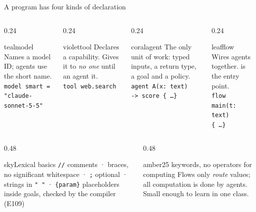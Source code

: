 \documentclass[aspectratio=169,11pt]{beamer}
\begin{document}
\begin{frame}[fragile]{A program has four kinds of declaration}
\vspace{1mm}
\begin{columns}[T]
\begin{column}{0.24\textwidth}
\begin{card}{teal}{model}
Names a model ID; agents use the short name.
\vspace{1mm}\\\texttt{\scriptsize model smart =\\"claude-sonnet-5-5"}
\end{card}
\end{column}
\begin{column}{0.24\textwidth}
\begin{card}{violet}{tool}
Declares a capability. Gives it to \emph{no one} until an agent  it.
\vspace{1mm}\\\texttt{\scriptsize tool web.search}
\end{card}
\end{column}
\begin{column}{0.24\textwidth}
\begin{card}{coral}{agent}
The only unit of work: typed inputs, a return type, a goal and a policy.
\vspace{1mm}\\\texttt{\scriptsize agent A(x: text)\\-> score \{ \dots \}}
\end{card}
\end{column}
\begin{column}{0.24\textwidth}
\begin{card}{leaf}{flow}
Wires agents together.  is the entry point.
\vspace{1mm}\\\texttt{\scriptsize flow main(t: text)\\\{ \dots \}}
\end{card}
\end{column}
\end{columns}
\vspace{2mm}
\begin{columns}[T]
\begin{column}{0.48\textwidth}
\begin{card}{sky}{Lexical basics}
\texttt{//} comments · braces, no significant whitespace · \texttt{;} optional · strings in \texttt{"\,"} · \texttt{\{param\}} placeholders inside goals, checked by the compiler (E109)
\end{card}
\end{column}
\begin{column}{0.48\textwidth}
\begin{card}{amber}{25 keywords, no operators for computing}
Flows only \emph{route} values; all computation is done by agents. Small enough to learn in one class.
\end{card}
\end{column}
\end{columns}
\end{frame}
\end{document}
